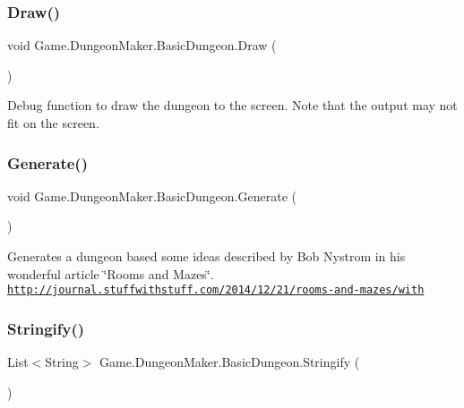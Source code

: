 \subsubsection{\texorpdfstring{Draw()}{Draw()}}
{\footnotesize\ttfamily void Game.\+Dungeon\+Maker.\+Basic\+Dungeon.\+Draw (\begin{DoxyParamCaption}{ }\end{DoxyParamCaption})}



Debug function to draw the dungeon to the screen. Note that the output may not fit on the screen. 

\mbox{\label{class_game_1_1_dungeon_maker_1_1_basic_dungeon_ad9b7fb9bf2e0cdf3abfe49140168685e}} 
\subsubsection{\texorpdfstring{Generate()}{Generate()}}
{\footnotesize\ttfamily void Game.\+Dungeon\+Maker.\+Basic\+Dungeon.\+Generate (\begin{DoxyParamCaption}{ }\end{DoxyParamCaption})}



Generates a dungeon based some ideas described by Bob Nystrom in his wonderful article \char`\"{}\+Rooms and Mazes\char`\"{}. \href{http://journal.stuffwithstuff.com/2014/12/21/rooms-and-mazes/with}{\tt http\+://journal.\+stuffwithstuff.\+com/2014/12/21/rooms-\/and-\/mazes/with} 

\mbox{\label{class_game_1_1_dungeon_maker_1_1_basic_dungeon_a5ea4d65fbdf434976300b6e655d8b8d0}} 
\subsubsection{\texorpdfstring{Stringify()}{Stringify()}}
{\footnotesize\ttfamily List$<$String$>$ Game.\+Dungeon\+Maker.\+Basic\+Dungeon.\+Stringify (\begin{DoxyParamCaption}{ }\end{DoxyParamCaption})}




